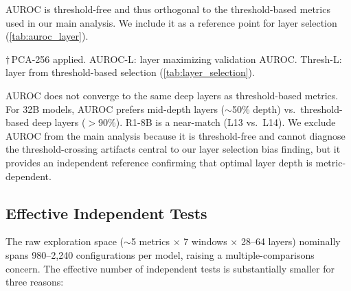 AUROC is threshold-free and thus orthogonal to the threshold-based metrics used in our main analysis. We include it as a reference point for layer selection (\cref{tab:auroc_layer}).

\begin{table}[htbp]
\centering
\small
\caption{AUROC-optimal vs.\ threshold-based layer selection. AUROC selects mid-depth layers for 32B models (${\sim}$50\%), diverging from threshold-based deep layers ($>$90\%). PCA-256 applied to 32B models for tractability.}
\label{tab:auroc_layer}
\setlength{\tabcolsep}{3pt}
\begin{flushleft}
\scriptsize $\dagger$\,PCA-256 applied. AUROC-L: layer maximizing validation AUROC. Thresh-L: layer from threshold-based selection (\cref{tab:layer_selection}).
\end{flushleft}
\end{table}

AUROC does not converge to the same deep layers as threshold-based metrics. For 32B models, AUROC prefers mid-depth layers (${\sim}$50\% depth) vs.\ threshold-based deep layers ($>$90\%). R1-8B is a near-match (L13 vs.\ L14). We exclude AUROC from the main analysis because it is threshold-free and cannot diagnose the threshold-crossing artifacts central to our layer selection bias finding, but it provides an independent reference confirming that optimal layer depth is metric-dependent.

\subsection{Effective Independent Tests}
\label{app:effective_tests}

The raw exploration space (${\sim}$5 metrics $\times$ 7 windows $\times$ 28--64 layers) nominally spans 980--2{,}240 configurations per model, raising a multiple-comparisons concern. The effective number of independent tests is substantially smaller for three reasons:

